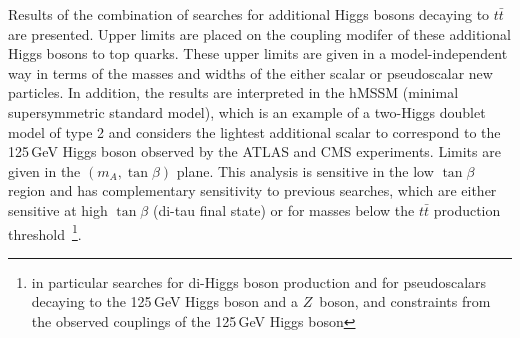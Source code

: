 Results of the combination of searches for additional Higgs bosons decaying to $t\bar t$ are presented.
Upper limits are placed on the coupling modifer of these additional Higgs bosons to top quarks.
These upper limits are given in a model-independent way in terms of the masses and widths of the either scalar or pseudoscalar new particles.
In addition, the results are interpreted in the hMSSM (minimal supersymmetric standard model), which is an example of a two-Higgs doublet model of type 2 and considers the lightest additional scalar to correspond to the 125\,GeV Higgs boson observed by the ATLAS and CMS experiments.
Limits are given in the $(m_A, \tan\beta)$ plane.
This analysis is sensitive in the low $\tan\beta$ region and has complementary sensitivity to previous searches, which are either sensitive at high $\tan\beta$ (di-tau final state) or for masses below the $t\bar t$ production threshold~\footnote{in particular searches for di-Higgs boson production and for pseudoscalars decaying to the 125\,GeV Higgs boson and a $Z$~boson, and constraints from the observed couplings of the 125\,GeV Higgs boson}.


\clearpage{\pagestyle{empty}\cleardoublepage}

\renewcommand*{\thesection}{\thechapter.\arabic{section}}       %



